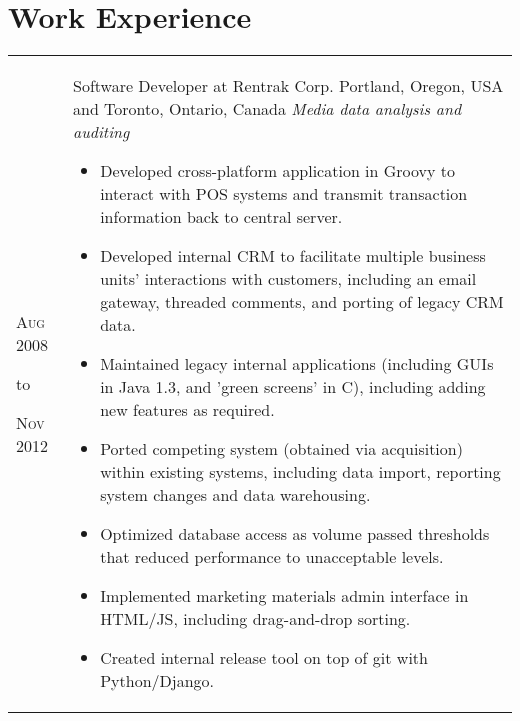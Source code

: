 {{{{{{{{{{{        \section{Work Experience}
        \begin{tabular}{ R{1.5cm} | p{10.5cm} }
            \hfill \textsc{Aug 2008}\newline
            \begin{center} to \end{center}
            \hfill \textsc{Nov 2012} &
                            Software Developer at Rentrak Corp.\newline
                            Portland, Oregon, USA and Toronto, Ontario, Canada\newline
                            \emph{Media data analysis and auditing} \newline
                            \fontsize{9pt}{10pt}\selectfont
                            \begin{itemize}
                                \item Developed cross-platform application in Groovy to interact with POS
                                    systems and transmit transaction information back to central server.
                                \item Developed internal CRM to facilitate multiple business units' interactions
                                    with customers, including an email gateway, threaded comments, and porting of
                                    legacy CRM data.
                                \item Maintained legacy internal applications (including GUIs in Java 1.3, and
                                    'green screens' in C), including adding new features as required.
                                \item Ported competing system (obtained via acquisition) within existing systems,
                                    including data import, reporting system changes and data warehousing.
                                \item Optimized database access as volume passed thresholds that reduced
                                    performance to unacceptable levels.
                                \item Implemented marketing materials admin interface in HTML/JS, including
                                    drag-and-drop sorting.
                                \item Created internal release tool on top of git with Python/Django.

\end{itemize}
\end{tabular}}}}}}}}}}}}
